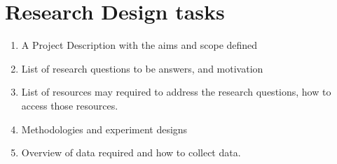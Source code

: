 \section{Research Design tasks}
\begin{enumerate}
    \item A Project Description with the aims and scope defined
    \item List of research questions to be answers, and motivation
    \item List of resources may required to address the research questions, how to access those resources.
    \item Methodologies and experiment designs
    \item Overview of data required and how to collect data.
\end{enumerate}
